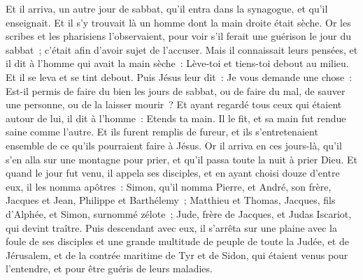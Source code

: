 \begin{multicols}{2}
Et il arriva, un autre jour de sabbat, qu'il entra dans la synagogue, et qu'il enseignait. Et il s'y trouvait là un homme dont la main droite était sèche.
Or les scribes et les pharisiens l'observaient, pour voir s'il ferait une guérison le jour du sabbat~; c'était afin d'avoir sujet de l'accuser.
Mais il connaissait leurs pensées, et il dit à l'homme qui avait la main sèche~: Lève-toi et tiens-toi debout au milieu. Et il se leva et se tint debout.
Puis Jésus leur dit~: Je vous demande une chose~: Est-il permis de faire du bien les jours de sabbat, ou de faire du mal, de sauver une personne, ou de la laisser mourir~?
Et ayant regardé tous ceux qui étaient autour de lui, il dit à l'homme~: Etends ta main. Il le fit, et sa main fut rendue saine comme l'autre.
Et ils furent remplis de fureur, et ils s'entretenaient ensemble de ce qu'ils pourraient faire à Jésus.
Or il arriva en ces jours-là, qu'il s'en alla sur une montagne pour prier, et qu'il passa toute la nuit à prier Dieu.
Et quand le jour fut venu, il appela ses disciples, et en ayant choisi douze d'entre eux, il les nomma apôtres~:
Simon, qu'il nomma Pierre, et André, son frère, Jacques et Jean, Philippe et Barthélemy~;
Matthieu et Thomas, Jacques, fils d'Alphée, et Simon, surnommé zélote~;
Jude, frère de Jacques, et Judas Iscariot, qui devint traître.
Puis descendant avec eux, il s'arrêta sur une plaine avec la foule de ses disciples et une grande multitude de peuple de toute la Judée, et de Jérusalem, et de la contrée maritime de Tyr et de Sidon, qui étaient venus pour l'entendre, et pour être guéris de leurs maladies.

\end{multicols}
